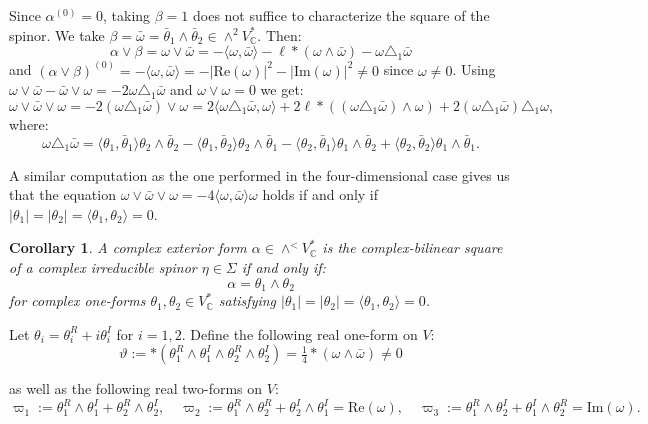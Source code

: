 \documentclass[10pt,a4paper,twoside,reqno]{amsart}
\theoremstyle{plain}
\newtheorem{cor}[thm]{Corollary}
\theoremstyle{definition}
\theoremstyle{remark}
\def\C{\mathbb{C}}
\def\Re{\mathrm{Re}}
\def\Im{\mathrm{Im}}
\newcommand{\abs}[1]{\left\lvert#1\right\rvert}
\newcommand{\escal}[1]{\langle#1\rangle}
\begin{document}
Since $\alpha^{(0)}=0$, taking $\beta=1$ does not suffice to characterize the square of the spinor. We take $\beta=\bar\omega=\bar\theta_1\wedge\bar\theta_2\in\wedge^2V^*_\C$. Then: $$\alpha\vee\beta=\omega\vee\bar\omega=-\escal{\omega,\bar\omega}-\ell*(\omega\wedge\bar\omega)-\omega\triangle_1\bar\omega$$ and $(\alpha\vee\beta)^{(0)}=-\escal{\omega,\bar\omega}=-\abs{\Re(\omega)}^2-\abs{\Im(\omega)}^2\neq0$ since $\omega\neq0$. Using $\omega\vee\bar\omega-\bar\omega\vee\omega=-2\omega\triangle_1\bar\omega$ and $\omega\vee\omega=0$ we get:
$$\omega\vee\bar\omega\vee\omega=-2(\omega\triangle_1\bar\omega)\vee\omega=2\escal{\omega\triangle_1\bar\omega,\omega}+2\ell*((\omega\triangle_1\bar\omega)\wedge\omega)+2(\omega\triangle_1\bar\omega)\triangle_1\omega,$$
where: $$\omega\triangle_1\bar\omega=\escal{\theta_1,\bar\theta_1}\theta_2\wedge\bar\theta_2-\escal{\theta_1,\bar\theta_2}\theta_2\wedge\bar\theta_1-\escal{\theta_2,\bar\theta_1}\theta_1\wedge\bar\theta_2+\escal{\theta_2,\bar\theta_2}\theta_1\wedge\bar\theta_1.$$

A similar computation as the one performed in the four-dimensional case gives us that the equation $\omega\vee\bar\omega\vee\omega=-4\escal{\omega,\bar\omega}\omega$ holds if and only if $\abs{\theta_1}=\abs{\theta_2}=\escal{\theta_1,\theta_2}=0$.

\begin{cor}
\label{cor:Bilinear5d}
A complex exterior form $\alpha\in\wedge^< V^*_\C$ is the complex-bilinear square of a complex irreducible spinor $\eta\in\Sigma$ if and only if: $$\alpha=\theta_1\wedge\theta_2$$ for complex one-forms $\theta_1,\theta_2 \in V^{\ast}_{\C}$ satisfying $\abs{\theta_1}=\abs{\theta_2}=\escal{\theta_1,\theta_2}=0$.
\end{cor}

Let $\theta_i=\theta_i^R+i\theta_i^I$ for $i=1,2$. Define the following real one-form on $V$: 
\begin{equation*}
\vartheta:=*(\theta_1^R\wedge\theta_1^I\wedge\theta_2^R\wedge\theta_2^I)=\tfrac{1}{4}*(\omega\wedge\bar\omega)\neq0    
\end{equation*}

\noindent
as well as the following real two-forms on $V$: 
\begin{equation*}
\varpi_1:=\theta_1^R\wedge\theta_1^I+\theta_2^R\wedge\theta_2^I,\quad\varpi_2:=\theta_1^R\wedge\theta_2^R+\theta_2^I\wedge\theta_1^I=\Re(\omega),\quad\varpi_3:=\theta_1^R\wedge\theta_2^I+\theta_1^I\wedge\theta_2^R=\Im(\omega).    
\end{equation*}
 
\end{document}
